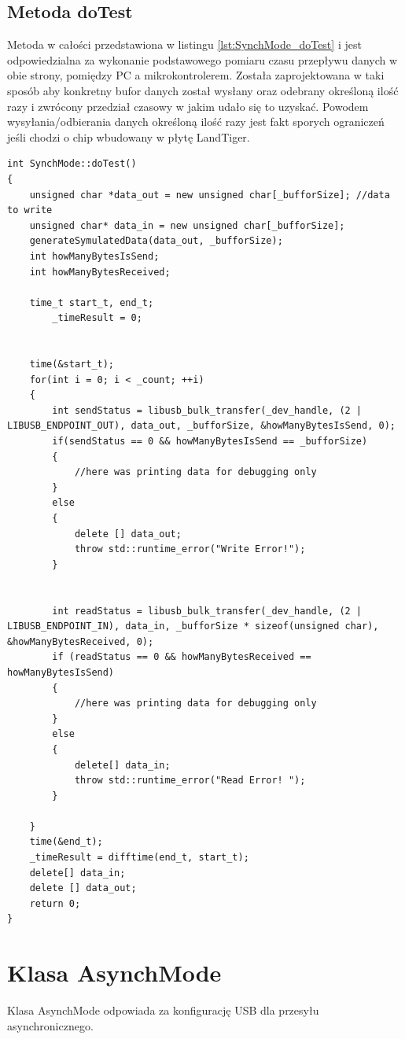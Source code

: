 \documentclass{BscUS}
\begin{document}
\subsection{Metoda doTest}
Metoda w całości przedstawiona w listingu \ref{lst:SynchMode_doTest} i jest odpowiedzialna za wykonanie podstawowego pomiaru czasu przepływu danych w obie strony, pomiędzy PC a mikrokontrolerem.
Została zaprojektowana w taki sposób aby konkretny bufor danych został wysłany oraz odebrany określoną ilość razy i zwrócony przedział czasowy w jakim udało się to uzyskać. Powodem wysyłania/odbierania danych określoną ilość razy jest fakt sporych ograniczeń jeśli chodzi o chip wbudowany w płytę LandTiger.
\begin{lstlisting}[caption={Metoda SynchMode::doTest()},label={lst:SynchMode_doTest}]
int SynchMode::doTest()
{
	unsigned char *data_out = new unsigned char[_bufforSize]; //data to write
	unsigned char* data_in = new unsigned char[_bufforSize];
	generateSymulatedData(data_out, _bufforSize);
	int howManyBytesIsSend; 
	int howManyBytesReceived;

	time_t start_t, end_t;
    	_timeResult = 0;

	
	time(&start_t);
	for(int i = 0; i < _count; ++i)
	{
		int sendStatus = libusb_bulk_transfer(_dev_handle, (2 | LIBUSB_ENDPOINT_OUT), data_out, _bufforSize, &howManyBytesIsSend, 0); 
		if(sendStatus == 0 && howManyBytesIsSend == _bufforSize)
		{
			//here was printing data for debugging only
		}
		else
		{
			delete [] data_out;
			throw std::runtime_error("Write Error!");
		}
		
		
		int readStatus = libusb_bulk_transfer(_dev_handle, (2 | LIBUSB_ENDPOINT_IN), data_in, _bufforSize * sizeof(unsigned char), &howManyBytesReceived, 0);
		if (readStatus == 0 && howManyBytesReceived == howManyBytesIsSend) 
		{
			//here was printing data for debugging only
		} 
		else 
		{
			delete[] data_in;
			throw std::runtime_error("Read Error! ");
		}
		
	}
	time(&end_t);
	_timeResult = difftime(end_t, start_t);
	delete[] data_in;
	delete [] data_out;
	return 0;
}
\end{lstlisting}
\section{Klasa AsynchMode}
Klasa AsynchMode odpowiada za konfigurację USB dla przesyłu asynchronicznego. 
\end{document}
